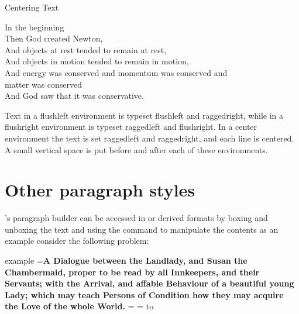 \begin{texexample}{Centering Text}{}
\begin{center}
In the beginning\\
Then God created Newton,\\
And objects at rest tended to remain at rest,\\
And objects in motion tended to remain in motion,\\
And energy was conserved and momentum was conserved and\\
matter was conserved\\
And God saw that it was conservative.\\
\end{center}
\end{texexample}


Text in a flushleft environment is typeset flushleft and raggedright, while in a
flushright environment is typeset raggedleft and flushright. In a center environment
the text is set raggedleft and raggedright, and each line is centered. A small vertical space
is put before and after each of these environments.


\section{Other paragraph styles}

\tex's paragraph builder can be accessed in \tex or \latex derived formats by boxing and unboxing the text and using the command \cmd{\lastbox} to manipulate the contents as an example consider the following problem:

\def\weirdtitle#1{%
       \bgroup
       \setbox0=\vbox{\bf\noindent #1}%
       \setbox1=\vbox{%
            \unvbox0
            \setbox2=\lastbox
            \hbox to \linewidth{\hfill\unhbox2 \hfill}%
       }%
       \unvbox1
      \egroup
  }%

\def\wavelast#1{%
       \bgroup
       \setbox0=\vbox{\bf\noindent #1}%
       \setbox1=\vbox{%
            \unvbox0
            \setbox2=\lastbox
            \hbox to \linewidth{\hfill\uwave{\unhbox2}\hfill}%
       }%
      \egroup
  }%
  
\begin{scriptexample}{example}{}
\weirdtitle{A Dialogue between the Landlady, and Susan the Chambermaid, proper to be
read by all Innkeepers, and their Servants; with the Arrival, and
affable Behaviour of a beautiful young Lady; which may teach Persons of
Condition how they may acquire the Love of the whole World.}
\end{scriptexample}

